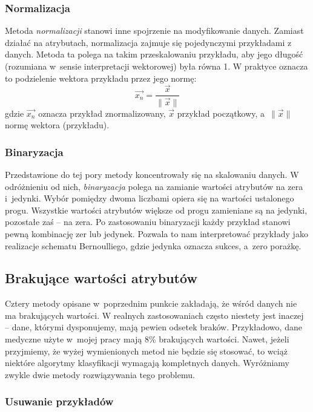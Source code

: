 \documentclass[../thesis.tex]{subfiles}
\begin{document}
\subsubsection{Normalizacja}

Metoda \emph{normalizacji} stanowi inne spojrzenie na modyfikowanie danych. Zamiast działać na atrybutach, normalizacja zajmuje się pojedynczymi przykładami z danych. Metoda ta polega na takim przeskalowaniu przykładu, aby jego długość (rozumiana w~sensie interpretacji wektorowej) była równa 1. W praktyce oznacza to podzielenie wektora przykładu przez jego normę:
\[\vec{x_n} = \frac{\vec{x}}{\|\vec{x}\|}\]
gdzie $\vec{x_n}$ oznacza przykład znormalizowany, $\vec{x}$ przykład początkowy, a~$\|\vec{x}\|$ normę wektora (przykładu).

\subsubsection{Binaryzacja}

Przedstawione do tej pory metody koncentrowały się na skalowaniu danych. W odróżnieniu od nich, \emph{binaryzacja} polega na zamianie wartości atrybutów na zera i~jedynki. Wybór pomiędzy dwoma liczbami  opiera się na wartości ustalonego progu. Wszystkie wartości atrybutów większe od progu zamieniane są na jedynki, pozostałe zaś – na zera. Po zastosowaniu binaryzacji każdy przykład stanowi pewną kombinację zer lub jedynek. Pozwala to nam interpretować przykłady jako realizacje schematu Bernoulliego, gdzie jedynka oznacza sukces, a~zero porażkę.

\subsection{Brakujące wartości atrybutów}

Cztery metody opisane w~poprzednim punkcie zakładają, że wśród danych nie ma brakujących wartości. W realnych zastosowaniach często niestety jest inaczej – dane, którymi dysponujemy, mają  pewien odsetek braków. Przykładowo, dane medyczne użyte w~mojej pracy mają 8\% brakujących wartości. Nawet, jeżeli przyjmiemy, że wyżej wymienionych metod nie będzie się stosować, to wciąż niektóre algorytmy klasyfikacji wymagają kompletnych danych. Wyróżniamy zwykle dwie metody rozwiązywania tego problemu.

\subsubsection{Usuwanie przykładów}
\end{document}
